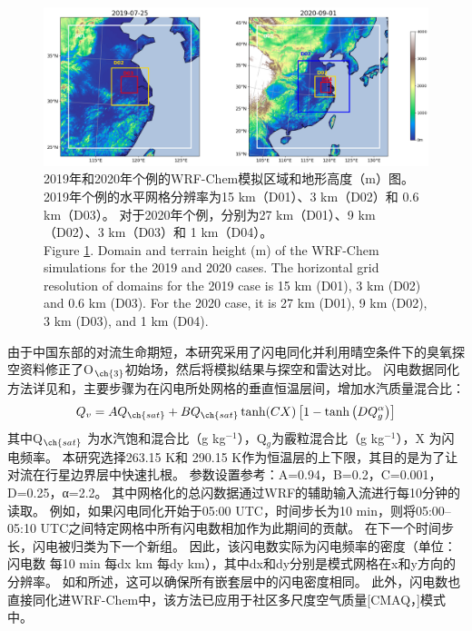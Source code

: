 \begin{figure}[H]
\centering
\includegraphics[width=\textwidth]{./figures/domains_china.png}
\caption{2019年和2020年个例的WRF-Chem模拟区域和地形高度（m）图。
2019年个例的水平网格分辨率为15 km（D01）、3 km（D02）和 0.6 km（D03）。
对于2020年个例，分别为27 km（D01）、9 km（D02）、3 km（D03）和 1 km（D04）。\\
Figure \ref{fig:domains_china}. Domain and terrain height (m) of the WRF-Chem simulations for the 2019 and 2020 cases. The horizontal grid resolution of
domains for the 2019 case is 15 km (D01), 3 km (D02) and 0.6 km (D03). For the 2020 case, it is 27 km (D01), 9 km (D02), 3 km (D03),
and 1 km (D04).}
\label{fig:domains_china}
\end{figure}

由于中国东部的对流生命期短，本研究采用了闪电同化并利用晴空条件下的臭氧探空资料修正了O$_{\ch{3}}$初始场，然后将模拟结果与探空和雷达对比。
闪电数据同化方法详见\citet{Fierro.2012}和\citet{Li.2017b}，主要步骤为在闪电所处网格的垂直恒温层间，增加水汽质量混合比：
\begin{equation} \label{eq:lda}
Q_{v}=A Q_{\ch{sat}}+B Q_{\ch{sat}} \tanh (C X)\left[1-\tanh \left(D Q_{g}^{\alpha}\right)\right]
\end{equation}
其中Q$_{\ch{sat}}$ 为水汽饱和混合比（g kg$^{−1}$），Q$_g$为霰粒混合比（g kg$^{−1}$），X 为闪电频率。
本研究选择263.15 K和 290.15 K作为恒温层的上下限，其目的是为了让对流在行星边界层中快速扎根\citep{Marchand.2014,Finney.2016,Li.2017b}。
参数设置参考\citet{Li.2017b}：A=0.94，B=0.2，C=0.001，D=0.25，α=2.2。
其中网格化的总闪数据通过WRF的辅助输入流进行每10分钟的读取。
例如，如果闪电同化开始于05:00 UTC，时间步长为10 min，则将05:00--05:10 UTC之间特定网格中所有闪电数相加作为此期间的贡献。
在下一个时间步长，闪电被归类为下一个新组。
因此，该闪电数实际为闪电频率的密度（单位：闪电数 每10 min 每dx km 每dy km），其中dx和dy分别是模式网格在x和y方向的分辨率。
如\citet{Fierro.2012}和\citet{Li.2017b}所述，这可以确保所有嵌套层中的闪电密度相同。
此外，闪电数也直接同化进WRF-Chem中，该方法已应用于社区多尺度空气质量[CMAQ，\citet{Kang.2019a,Kang.2019,Kang.2020}]模式中。


